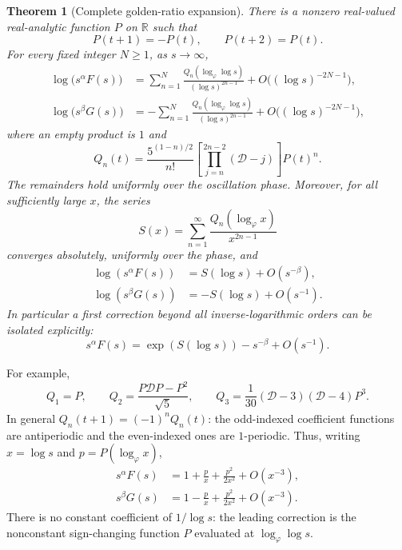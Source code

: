 \documentclass[11pt]{article}
\numberwithin{equation}{section}
\newtheorem{theorem}{Theorem}[section]
\theoremstyle{definition}
\theoremstyle{remark}
\begin{document}
\begin{theorem}[Complete golden-ratio expansion]\label{gdy:dyn:thm:allorders}
There is a nonzero real-valued real-analytic function $P$ on $\mathbb R$
such that
\begin{equation}\label{gdy:dyn:eq:anti}
 P(t+1)=-P(t),\qquad P(t+2)=P(t).
\end{equation}
For every fixed integer $N\ge1$, as $s\to\infty$,
\begin{align}
 \log\bigl(s^\alpha F(s)\bigr)
 &=\sum_{n=1}^{N}
   \frac{Q_n(\log_\varphi\log s)}{(\log s)^{2n-1}}
   +O\bigl((\log s)^{-2N-1}\bigr),\label{gdy:dyn:eq:Ffull}\\
 \log\bigl(s^\beta G(s)\bigr)
 &=-\sum_{n=1}^{N}
   \frac{Q_n(\log_\varphi\log s)}{(\log s)^{2n-1}}
   +O\bigl((\log s)^{-2N-1}\bigr),\label{gdy:dyn:eq:Gfull}
\end{align}
where an empty product is $1$ and
\begin{equation}\label{gdy:dyn:eq:Qformula}
 Q_n(t)=\frac{5^{(1-n)/2}}{n!}
 \left[\prod_{j=n}^{2n-2}(\mathcal D-j)\right]P(t)^n.
\end{equation}
The remainders hold uniformly over the oscillation phase. Moreover, for
all sufficiently large $x$, the series
\begin{equation}\label{gdy:dyn:eq:Sconvergent}
 S(x)=\sum_{n=1}^{\infty}\frac{Q_n(\log_\varphi x)}{x^{2n-1}}
\end{equation}
converges absolutely, uniformly over the phase, and
\begin{align}
 \log(s^\alpha F(s))&=S(\log s)+O(s^{-\beta}),
       \label{gdy:dyn:eq:Fsector}\\
 \log(s^\beta G(s))&=-S(\log s)+O(s^{-1}).
       \label{gdy:dyn:eq:Gsector}
\end{align}
In particular a first correction beyond all inverse-logarithmic orders
can be isolated explicitly:
\begin{equation}\label{gdy:dyn:eq:beyond}
 s^\alpha F(s)=\exp(S(\log s))-s^{-\beta}+O(s^{-1}).
\end{equation}
\end{theorem}

For example,
\begin{equation}\label{gdy:dyn:eq:Qfirst}
 Q_1=P,\qquad
 Q_2=\frac{P\mathcal DP-P^2}{\sqrt5},\qquad
 Q_3=\frac1{30}(\mathcal D-3)(\mathcal D-4)P^3.
\end{equation}
In general $Q_n(t+1)=(-1)^nQ_n(t)$: the odd-indexed coefficient
functions are antiperiodic and the even-indexed ones are $1$-periodic.
Thus, writing $x=\log s$ and $p=P(\log_\varphi x)$,
\begin{align}
 s^\alpha F(s)
 &=1+\frac{p}{x}+\frac{p^2}{2x^2}+O(x^{-3}),\label{gdy:dyn:eq:Ffirst}\\
 s^\beta G(s)
 &=1-\frac{p}{x}+\frac{p^2}{2x^2}+O(x^{-3}).\label{gdy:dyn:eq:Gfirst}
\end{align}
There is no constant coefficient of $1/\log s$: the leading correction
is the nonconstant sign-changing function $P$ evaluated at
$\log_\varphi\log s$.
\end{document}
